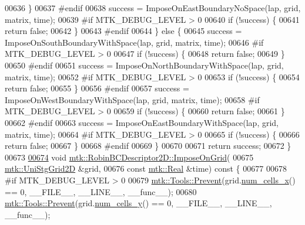 \begin{DoxyCode}
00636     \}
00637 \textcolor{preprocessor}{    #endif}
00638     success = ImposeOnEastBoundaryNoSpace(lap, grid, matrix, time);
00639 \textcolor{preprocessor}{    #if MTK\_DEBUG\_LEVEL > 0}
00640     \textcolor{keywordflow}{if} (!success) \{
00641       \textcolor{keywordflow}{return} \textcolor{keyword}{false};
00642     \}
00643 \textcolor{preprocessor}{    #endif}
00644   \} \textcolor{keywordflow}{else} \{
00645     success = ImposeOnSouthBoundaryWithSpace(lap, grid, matrix, time);
00646 \textcolor{preprocessor}{    #if MTK\_DEBUG\_LEVEL > 0}
00647     \textcolor{keywordflow}{if} (!success) \{
00648       \textcolor{keywordflow}{return} \textcolor{keyword}{false};
00649     \}
00650 \textcolor{preprocessor}{    #endif}
00651     success = ImposeOnNorthBoundaryWithSpace(lap, grid, matrix, time);
00652 \textcolor{preprocessor}{    #if MTK\_DEBUG\_LEVEL > 0}
00653     \textcolor{keywordflow}{if} (!success) \{
00654       \textcolor{keywordflow}{return} \textcolor{keyword}{false};
00655     \}
00656 \textcolor{preprocessor}{    #endif}
00657     success = ImposeOnWestBoundaryWithSpace(lap, grid, matrix, time);
00658 \textcolor{preprocessor}{    #if MTK\_DEBUG\_LEVEL > 0}
00659     \textcolor{keywordflow}{if} (!success) \{
00660       \textcolor{keywordflow}{return} \textcolor{keyword}{false};
00661     \}
00662 \textcolor{preprocessor}{    #endif}
00663     success = ImposeOnEastBoundaryWithSpace(lap, grid, matrix, time);
00664 \textcolor{preprocessor}{    #if MTK\_DEBUG\_LEVEL > 0}
00665     \textcolor{keywordflow}{if} (!success) \{
00666       \textcolor{keywordflow}{return} \textcolor{keyword}{false};
00667     \}
00668 \textcolor{preprocessor}{    #endif}
00669   \}
00670 
00671   \textcolor{keywordflow}{return} success;
00672 \}
00673 
\hypertarget{mtk__robin__bc__descriptor__2d_8cc_source_l00674}{}\hyperlink{classmtk_1_1RobinBCDescriptor2D_ac9564bc46c196cbf4720a0e4b93da8b0}{00674} \textcolor{keywordtype}{void} \hyperlink{classmtk_1_1RobinBCDescriptor2D_ac9564bc46c196cbf4720a0e4b93da8b0}{mtk::RobinBCDescriptor2D::ImposeOnGrid}(
00675     \hyperlink{classmtk_1_1UniStgGrid2D}{mtk::UniStgGrid2D} &grid,
00676     \textcolor{keyword}{const} \hyperlink{group__c01-roots_gac080bbbf5cbb5502c9f00405f894857d}{mtk::Real} &time)\textcolor{keyword}{ const }\{
00677 
00678 \textcolor{preprocessor}{  #if MTK\_DEBUG\_LEVEL > 0}
00679   \hyperlink{classmtk_1_1Tools_a332324c6f25e66be9dff48c5987a3b9f}{mtk::Tools::Prevent}(grid.\hyperlink{classmtk_1_1UniStgGrid2D_a2d182866a398aba8e4829590e85bf939}{num\_cells\_x}() == 0, \_\_FILE\_\_, \_\_LINE\_\_, \_\_func\_\_);
00680   \hyperlink{classmtk_1_1Tools_a332324c6f25e66be9dff48c5987a3b9f}{mtk::Tools::Prevent}(grid.\hyperlink{classmtk_1_1UniStgGrid2D_aed05a801cc9a76dba0ff203cea58a61a}{num\_cells\_y}() == 0, \_\_FILE\_\_, \_\_LINE\_\_, \_\_func\_\_);

\end{DoxyCode}
